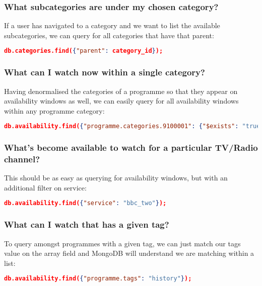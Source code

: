 \documentclass[11pt,a4paper]{article}
\begin{document}
\subsubsection{What subcategories are under my chosen category?}

If a user has navigated to a category and we want to list the available
subcategories, we can query for all categories that have that parent:

\begin{lstlisting}[language=json]
  db.categories.find({"parent": category_id});
\end{lstlisting}

\subsubsection{What can I watch now within a single category?}

Having denormalised the categories of a programme so that they appear
on availability windows as well, we can easily query for all
availability windows within any programme category:

\begin{lstlisting}[language=json]
  db.availability.find({"programme.categories.9100001": {"$exists": "true"}});
\end{lstlisting}

\subsubsection{What's become available to watch for a particular TV/Radio channel?}

This should be as easy as querying for availability windows, but with an
additional filter on service:

\begin{lstlisting}[language=json]
  db.availability.find({"service": "bbc_two"});
\end{lstlisting}

\subsubsection{What can I watch that has a given tag?}

To query amongst programmes with a given tag, we can just match our
tags value on the
array field and MongoDB will understand we are matching within
a list:

\begin{lstlisting}[language=json]
  db.availability.find({"programme.tags": "history"});
\end{lstlisting}
\end{document}
